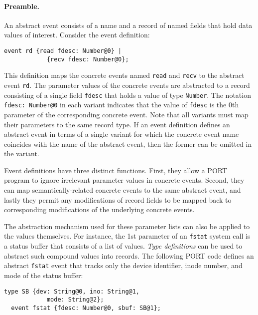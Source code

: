 \paragraph*{Preamble.}

An abstract event consists of a name and a record of named fields that hold data values of interest. Consider the event definition:
\begin{lstlisting}[numbers=none,xleftmargin=0em,gobble=2,columns=strict]
  event rd {read fdesc: Number@0} |
            {recv fdesc: Number@0};
\end{lstlisting}
This definition maps the concrete events named \lstinline+read+ and \lstinline+recv+ to the abstract event \lstinline+rd+. The parameter values of the concrete events are abstracted to a record consisting of a single field \lstinline+fdesc+ that holds a value of type \lstinline+Number+. The notation \lstinline+fdesc: Number@0+ in each variant indicates that the value of \lstinline+fdesc+ is the 0th parameter of the corresponding concrete event. Note that all variants must map their parameters to the same record type.
If an event definition defines an abstract event in terms of a single variant for which the concrete event name coincides with the name of the abstract event, then the former can be omitted in the variant.

Event definitions have three distinct functions. First, they allow a PORT program to ignore
irrelevant parameter values in concrete events. Second, they can map semantically-related concrete events to the same abstract event, and lastly they permit any modifications of record fields to be mapped back to corresponding modifications of the underlying concrete events.

The abstraction mechanism used for these parameter lists can also be applied to the values themselves. For instance, the 1st parameter of an \lstinline+fstat+ system call is a status buffer that consists of a list of values. \emph{Type definitions} can be used to abstract such compound values into records. The following PORT code defines an abstract \lstinline+fstat+ event that tracks only the device identifier, inode number, and mode of the status buffer:
\begin{lstlisting}[numbers=none,xleftmargin=0em,gobble=2]
  type SB {dev: String@0, ino: String@1,
            mode: String@2};
  event fstat {fdesc: Number@0, sbuf: SB@1};
\end{lstlisting}

